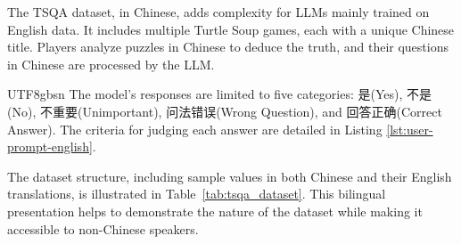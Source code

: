 \documentclass[conference]{IEEEtran}
\begin{document}
The TSQA dataset, in Chinese, adds complexity for LLMs mainly trained on English data. It includes multiple Turtle Soup games, each with a unique Chinese title. Players analyze puzzles in Chinese to deduce the truth, and their questions in Chinese are processed by the LLM.

\begin{CJK*}{UTF8}{gbsn}
The model's responses are limited to five categories: 是(Yes), 不是(No), 不重要(Unimportant), 问法错误(Wrong Question), and 回答正确(Correct Answer). The criteria for judging each answer are detailed in Listing \ref{lst:user-prompt-english}.
\end{CJK*}

\iffalse
The dataset structure, including sample values in both Chinese and their English translations, is illustrated in Table~\ref{tab:tsqa_dataset}. This bilingual presentation helps to demonstrate the nature of the dataset while making it accessible to non-Chinese speakers.
\end{document}
